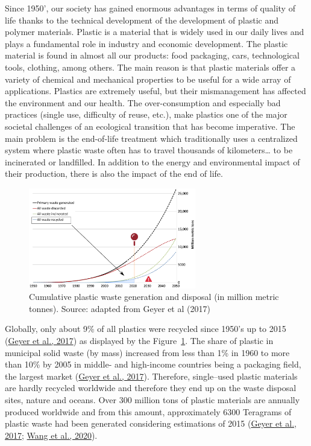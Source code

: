 \documentclass[
  11pt,
]{article}
\begin{document}
Since 1950', our society has gained enormous advantages in terms of
quality of life thanks to the technical development of the development
of plastic and polymer materials. Plastic is a material that is widely
used in our daily lives and plays a fundamental role in industry and
economic development. The plastic material is found in almost all our
products: food packaging, cars, technological tools, clothing, among
others. The main reason is that plastic materials offer a variety of
chemical and mechanical properties to be useful for a wide array of
applications. Plastics are extremely useful, but their mismanagement has
affected the environment and our health. The over-consumption and
especially bad practices (single use, difficulty of reuse, etc.), make
plastics one of the major societal challenges of an ecological
transition that has become imperative. The main problem is the
end-of-life treatment which traditionally uses a centralized system
where plastic waste often has to travel thousands of kilometers\ldots{}
to be incinerated or landfilled. In addition to the energy and
environmental impact of their production, there is also the impact of
the end of life.

\begin{figure}[H]

{\centering \includegraphics[width=0.65\textwidth,height=\textheight]{figures/Plastic-problem.png}

}

\caption{\label{fig-plastic-problem}Cumulative plastic waste generation
and disposal (in million metric tonnes). Source: adapted from Geyer et
al (2017)}

\end{figure}

Globally, only about 9\% of all plastics were recycled since 1950's up
to 2015 (\protect\hyperlink{ref-Geyer2017}{Geyer et al., 2017}) as
displayed by the Figure~\ref{fig-plastic-problem}. The share of plastic
in municipal solid waste (by mass) increased from less than 1\% in 1960
to more than 10\% by 2005 in middle- and high-income countries being a
packaging field, the largest market
(\protect\hyperlink{ref-Geyer2017}{Geyer et al., 2017}). Therefore,
single--used plastic materials are hardly recycled worldwide and
therefore they end up on the waste disposal sites, nature and oceans.
Over 300 million tons of plastic materials are annually produced
worldwide and from this amount, approximately 6300 Teragrams of plastic
waste had been generated considering estimations of 2015
(\protect\hyperlink{ref-Geyer2017}{Geyer et al., 2017};
\protect\hyperlink{ref-Wang2020a}{Wang et al., 2020}).
\end{document}
